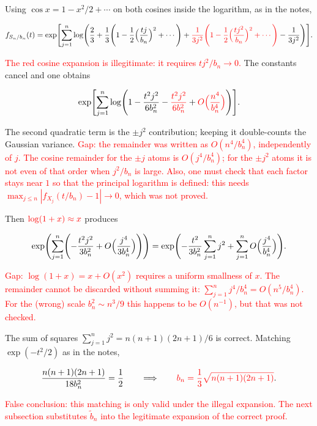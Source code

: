 \documentclass[11pt,a4paper]{article}
\newcommand{\mserr}[1]{\textcolor{red}{#1}}
\begin{document}
Using \(\cos x=1-x^{2}/2+\cdots\) on both cosines inside the logarithm, as in the notes,

\[
f_{S_{n}/b_{n}}(t)
=
\exp\Biggl[
\sum_{j=1}^{n}
\log\Biggl(
\frac23
+
\frac13\Biggl(1-\frac12\Bigl(\frac{tj}{b_{n}}\Bigr)^{2}+\cdots\Biggr)
+
\mserr{\frac{1}{3j^{2}}\Biggl(1-\frac12\Bigl(\frac{tj^{2}}{b_{n}}\Bigr)^{2}+\cdots\Biggr)}
-
\frac{1}{3j^{2}}
\Biggr)
\Biggr].
\]

\mserr{The red cosine expansion is illegitimate: it requires \(tj^{2}/b_{n}\to 0\).} The constants cancel and one obtains

\[
\exp\Biggl[
\sum_{j=1}^{n}
\log\Biggl(
1
-
\frac{t^{2}j^{2}}{6b_{n}^{2}}
-
\mserr{\frac{t^{2}j^{2}}{6b_{n}^{2}}}
+
\mserr{O\Bigl(\frac{n^{4}}{b_{n}^{4}}\Bigr)}
\Biggr)
\Biggr].
\]

The second quadratic term is the \(\pm j^{2}\) contribution; keeping it double-counts the Gaussian variance. \mserr{Gap: the remainder was written as \(O(n^{4}/b_{n}^{4})\), independently of \(j\). The cosine remainder for the \(\pm j\) atoms is \(O(j^{4}/b_{n}^{4})\); for the \(\pm j^{2}\) atoms it is not even of that order when \(j^{2}/b_{n}\) is large. Also, one must check that each factor stays near \(1\) so that the principal logarithm is defined: this needs \(\max_{j\le n}|f_{X_{j}}(t/b_{n})-1|\to 0\), which was not proved.}

Then \(\mserr{\log(1+x)\approx x}\) produces

\[
\exp\Biggl(
\sum_{j=1}^{n}
\Biggl(
-\frac{t^{2}j^{2}}{3b_{n}^{2}}
+
O\Bigl(\frac{j^{4}}{3b_{n}^{4}}\Bigr)
\Biggr)
\Biggr)
=
\exp\Biggl(
-\frac{t^{2}}{3b_{n}^{2}}\sum_{j=1}^{n}j^{2}
+
\sum_{j=1}^{n}O\Bigl(\frac{j^{4}}{b_{n}^{4}}\Bigr)
\Biggr).
\]

\mserr{Gap: \(\log(1+x)=x+O(x^{2})\) requires a uniform smallness of \(x\). The remainder cannot be discarded without summing it: \(\sum_{j=1}^{n}j^{4}/b_{n}^{4}=O(n^{5}/b_{n}^{4})\). For the (wrong) scale \(b_{n}^{2}\sim n^{3}/9\) this happens to be \(O(n^{-1})\), but that was not checked.}

The sum of squares \(\sum_{j=1}^{n}j^{2}=n(n+1)(2n+1)/6\) is correct. Matching \(\exp(-t^{2}/2)\) as in the notes,

\[
\frac{n(n+1)(2n+1)}{18b_{n}^{2}}
=
\frac12
\qquad\Longrightarrow\qquad
\mserr{b_{n}
=
\frac13\sqrt{n(n+1)(2n+1)}}.
\]

\mserr{False conclusion: this matching is only valid under the illegal expansion. The next subsection substitutes \(\tilde{b}_{n}\) into the legitimate expansion of the correct proof.}
\end{document}
